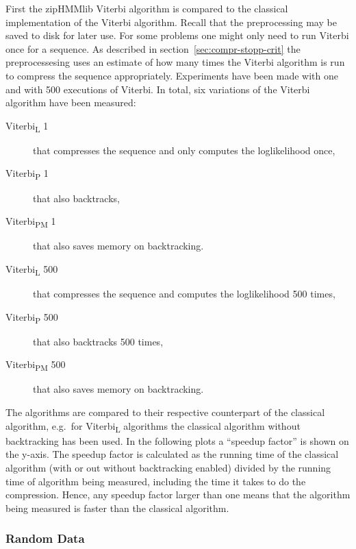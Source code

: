 First the zipHMMlib Viterbi algorithm is compared to the classical
implementation of the Viterbi algorithm. Recall that the preprocessing may be
saved to disk for later use. For some problems one might only need to run
Viterbi once for a sequence. As described in section~\ref{sec:compr-stopp-crit}
the preprocessesing uses an estimate of how many times the Viterbi algorithm is
run to compress the sequence appropriately. Experiments have been made with one
and with 500 executions of Viterbi. In total, six variations of the Viterbi
algorithm have been measured:
\begin{description}
\item[Viterbi\textsubscript{L} 1] that compresses the sequence and only computes the
  loglikelihood once,
\item[Viterbi\textsubscript{P} 1] that also backtracks,
\item[Viterbi\textsubscript{PM} 1] that also saves memory on backtracking.
\item[Viterbi\textsubscript{L} 500] that compresses the sequence and computes the
  loglikelihood 500 times,
\item[Viterbi\textsubscript{P} 500] that also backtracks 500 times,
\item[Viterbi\textsubscript{PM} 500] that also saves memory on backtracking.
\end{description}

The algorithms are compared to their respective counterpart of the classical
algorithm, e.g.\ for Viterbi\textsubscript{L} algorithms the classical
algorithm without backtracking has been used. In the following plots a
``speedup factor'' is shown on the y-axis. The speedup factor is calculated as
the running time of the classical algorithm (with or out without backtracking
enabled) divided by the running time of algorithm being measured, including the
time it takes to do the compression. Hence, any speedup factor larger than one
means that the algorithm being measured is faster than the classical algorithm.

\subsubsection{Random Data}

